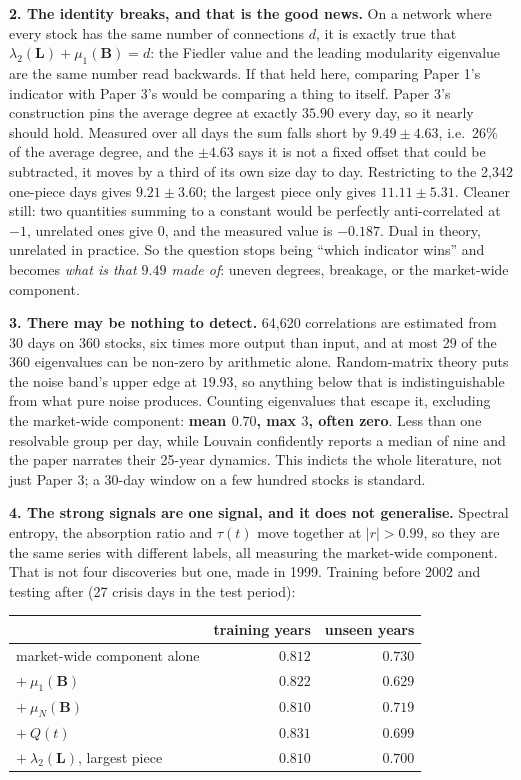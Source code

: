 \documentclass[11pt,a4paper]{article}
\newcommand{\Q}{Q}
\newcommand{\Lap}{\mathbf{L}}
\newcommand{\Bmat}{\mathbf{B}}
\begin{document}
\textbf{2. The identity breaks, and that is the good news.} On a network where
every stock has the same number of connections $d$, it is exactly true that
$\lambda_2(\Lap) + \mu_1(\Bmat) = d$: the Fiedler value and the leading
modularity eigenvalue are the same number read backwards. If that held here,
comparing Paper 1's indicator with Paper 3's would be comparing a thing to
itself. Paper 3's construction pins the average degree at exactly $35.90$ every
day, so it nearly should hold. Measured over all days the sum falls short by
$\mathbf{9.49 \pm 4.63}$, i.e.\ 26\% of the average degree, and the $\pm4.63$
says it is not a fixed offset that could be subtracted, it moves by a third of
its own size day to day. Restricting to the 2{,}342 one-piece days gives
$9.21 \pm 3.60$; the largest piece only gives $11.11 \pm 5.31$. Cleaner still:
two quantities summing to a constant would be perfectly anti-correlated at $-1$,
unrelated ones give $0$, and the measured value is $\mathbf{-0.187}$. Dual in
theory, unrelated in practice. So the question stops being ``which indicator
wins'' and becomes \emph{what is that $9.49$ made of}: uneven degrees, breakage,
or the market-wide component.

\textbf{3. There may be nothing to detect.} 64{,}620 correlations are estimated
from 30 days on 360 stocks, six times more output than input, and at most 29 of
the 360 eigenvalues can be non-zero by arithmetic alone. Random-matrix theory
puts the noise band's upper edge at $19.93$, so anything below that is
indistinguishable from what pure noise produces. Counting eigenvalues that
escape it, excluding the market-wide component: \textbf{mean $0.70$, max $3$,
often zero}. Less than one resolvable group per day, while Louvain confidently
reports a median of nine and the paper narrates their 25-year dynamics. This
indicts the whole literature, not just Paper 3; a 30-day window on a few hundred
stocks is standard.

\textbf{4. The strong signals are one signal, and it does not generalise.}
Spectral entropy, the absorption ratio and $\tau(t)$ move together at $|r| >
0.99$, so they are the same series with different labels, all measuring the
market-wide component. That is not four discoveries but one, made in 1999.
Training before 2002 and testing after (27 crisis days in the test period):

\begin{center}\small
\begin{tabular}{@{}lrr@{}}
\toprule
& training years & unseen years \\
\midrule
market-wide component alone & $0.812$ & $\mathbf{0.730}$ \\
\quad $+\ \mu_1(\Bmat)$ & $0.822$ & $0.629$ \\
\quad $+\ \mu_N(\Bmat)$ & $0.810$ & $0.719$ \\
\quad $+\ \Q(t)$ & $0.831$ & $0.699$ \\
\quad $+\ \lambda_2(\Lap)$, largest piece & $0.810$ & $0.700$ \\
\bottomrule
\end{tabular}
\end{center}
\end{document}
